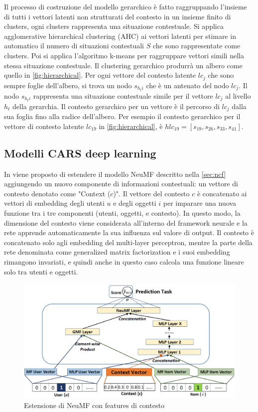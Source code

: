 \documentclass[12pt,italian]{report}
\begin{document}
Il processo di costruzione del modello gerarchico è fatto raggruppando l'insieme di tutti i vettori latenti non strutturati del contesto in un insieme finito di clusters, ogni clusters rappresenta una situazione contestuale. Si applica agglomerative hierarchical clustering (AHC) \cite{AHC} ai vettori latenti per stimare in automatico il numero di situazioni contestuali $S$ che sono rappresentate come clusters. Poi si applica l'algoritmo k-means per raggruppare vettori simili nella stessa situazione contestuale. Il clustering gerarchico produrrà un albero come quello in \autoref{fig:hierarchical}. Per ogni vettore del contesto latente $lc_j$ che sono sempre foglie dell'albero, si trova un nodo $s_{h_ti}$ che è un antenato del nodo $lc_j$. Il nodo $s_{h_ti}$ rappresenta una situazione contestuale simile per il vettore $lc_j$ al livello $h_t$ della gerarchia. Il contesto gerarchico per un vettore è il percorso di $lc_j$ dalla sua foglia fino alla radice dell'albero. Per esempio il contesto gerarchico per il vettore di contesto latente $lc_{19}$ in \autoref{fig:hierarchical}, è $hlc_{19} = [s_{19}, s_{26}, s_{33}, s_{41}]$.

\subsection{Modelli CARS deep learning}
In \cite{context-aware-deep-learning} viene proposto di estendere il modello NeuMF \cite{NCF} descritto nella \autoref{sec:ncf} aggiungendo un nuovo componente di informazioni contestuali: un vettore di contesto denotato come "Context ($c$)". Il vettore del contesto $c$ è concatenato ai vettori di embedding degli utenti $u$ e degli oggetti $i$ per imparare una nuova funzione tra i tre componenti (utenti, oggetti, e contesto). In questo modo, la dimensione del contesto viene considerata all'interno del framework neurale e la rete apprende automaticamente la sua influenza sul valore di output. Il contesto è concatenato solo agli embedding del multi-layer perceptron, mentre la parte della rete denominata come generalized matrix factorization e i suoi embedding rimangono invariati, e quindi anche in questo caso calcola una funzione lineare solo tra utenti e oggetti.

\begin{figure}
  \includegraphics[width=\linewidth]{immagini/cars-ncf.png}
  \caption{Estensione di NeuMF con features di contesto}
  \label{fig:context-neumf}
\end{figure}
\end{document}
